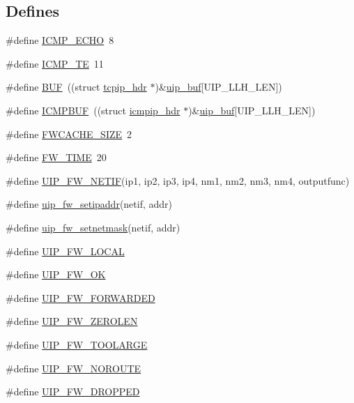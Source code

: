 \subsection*{Defines}
\begin{DoxyCompactItemize}
\item 
\#define \hyperlink{group__uipfw_gad58231410d58e34b455328b888a9e73c}{ICMP\_\-ECHO}~8
\item 
\#define \hyperlink{group__uipfw_ga58e03a47804158d97a9c069cc2204797}{ICMP\_\-TE}~11
\item 
\#define \hyperlink{group__uipfw_ga24f52ac52d6e714cb04a5aa01be3bdd0}{BUF}~((struct \hyperlink{structtcpip__hdr}{tcpip\_\-hdr} $\ast$)\&\hyperlink{group__uipdevfunc_gab81e78f890dbbee50c533a9734b74fd9}{uip\_\-buf}\mbox{[}UIP\_\-LLH\_\-LEN\mbox{]})
\item 
\#define \hyperlink{group__uipfw_ga4309376690872fa4beb4f025f5cc199b}{ICMPBUF}~((struct \hyperlink{structicmpip__hdr}{icmpip\_\-hdr} $\ast$)\&\hyperlink{group__uipdevfunc_gab81e78f890dbbee50c533a9734b74fd9}{uip\_\-buf}\mbox{[}UIP\_\-LLH\_\-LEN\mbox{]})
\item 
\#define \hyperlink{group__uipfw_ga628391fb3eeb786fe6246dc4fc0c3554}{FWCACHE\_\-SIZE}~2
\item 
\#define \hyperlink{group__uipfw_ga37a94c7dd987d85126d49aba7ed5ffe7}{FW\_\-TIME}~20
\item 
\#define \hyperlink{group__uipfw_ga6bdb97e217db4401d4433eb330293eaf}{UIP\_\-FW\_\-NETIF}(ip1, ip2, ip3, ip4, nm1, nm2, nm3, nm4, outputfunc)
\item 
\#define \hyperlink{group__uipfw_ga7acf2b0aff9ebcfb2f94dc6471055ca2}{uip\_\-fw\_\-setipaddr}(netif, addr)
\item 
\#define \hyperlink{group__uipfw_gadb02b40bfdb470acb6268ac71e22fc04}{uip\_\-fw\_\-setnetmask}(netif, addr)
\item 
\#define \hyperlink{group__uipfw_ga6836699b9dc9e93034c65b748fc1a9d3}{UIP\_\-FW\_\-LOCAL}
\item 
\#define \hyperlink{group__uipfw_gab3604366e1ccf7ac576e2a72845e0b7f}{UIP\_\-FW\_\-OK}
\item 
\#define \hyperlink{group__uipfw_ga01295e0a76eba8c53265da4264eee50d}{UIP\_\-FW\_\-FORWARDED}
\item 
\#define \hyperlink{group__uipfw_ga29ad276632f8b0a2e41700833d40cb4c}{UIP\_\-FW\_\-ZEROLEN}
\item 
\#define \hyperlink{group__uipfw_gaa98780b025dbb97d09b87c40c92d9e4c}{UIP\_\-FW\_\-TOOLARGE}
\item 
\#define \hyperlink{group__uipfw_ga6d2241b2ed1042167043cf4c63ae52b2}{UIP\_\-FW\_\-NOROUTE}
\item 
\#define \hyperlink{group__uipfw_ga5f290389f83e6c58d9e1d037bf284626}{UIP\_\-FW\_\-DROPPED}
\end{DoxyCompactItemize}
